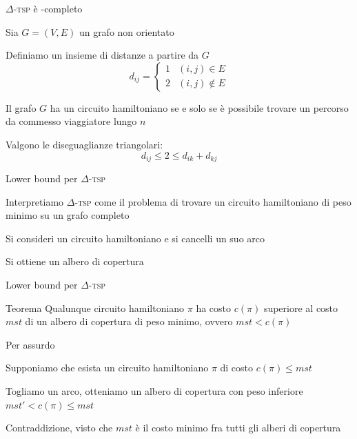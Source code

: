\begin{frame}{$\Delta$-\textsc{tsp} è \NP-completo}

\BIL
\item Sia $G=(V,E)$ un grafo non orientato 
\item Definiamo un insieme di distanze a partire da $G$
\medskip
\[
  d_{ij} = \begin{cases}
    1 & (i,j) \in E \\
    2 & (i,j) \notin E
  \end{cases}
\]    

\item Il grafo $G$ ha un circuito hamiltoniano se e solo se è possibile
trovare un percorso da commesso viaggiatore lungo $n$
\item Valgono le diseguaglianze triangolari: 
\medskip
\[
  d_{ij} \leq 2 \leq d_{ik}+d_{kj}
\]
\EIL
\end{frame}

\begin{frame}{Lower bound per $\Delta$-\textsc{tsp}}

\BIL
\item Interpretiamo $\Delta$-\textsc{tsp} come il problema di trovare
un circuito hamiltoniano di peso minimo su un grafo completo
\item Si consideri un circuito hamiltoniano e si cancelli un suo arco
\item Si ottiene un albero di copertura
\EIL

\medskip
{}

\end{frame}

\begin{frame}{Lower bound per $\Delta$-\textsc{tsp}}

\begin{block}{Teorema}
Qualunque circuito hamiltoniano $\pi$ ha costo $c(\pi)$ superiore al costo $\mathit{mst}$ di un albero di copertura di peso minimo, ovvero $\mathit{mst} < c(\pi)$
\end{block}    

\smallskip
{}
Per assurdo
\BIL 
\item Supponiamo che esista un circuito hamiltoniano $\pi$ di costo $c(\pi) \leq \mathit{mst}$
\item Togliamo un arco, otteniamo un albero di copertura con peso inferiore
$\mathit{mst}' < c(\pi) \leq \mathit{mst}$
\item Contraddizione, visto che $\mathit{mst}$ è il costo minimo fra tutti gli alberi di copertura 
\EIL

\end{frame}

